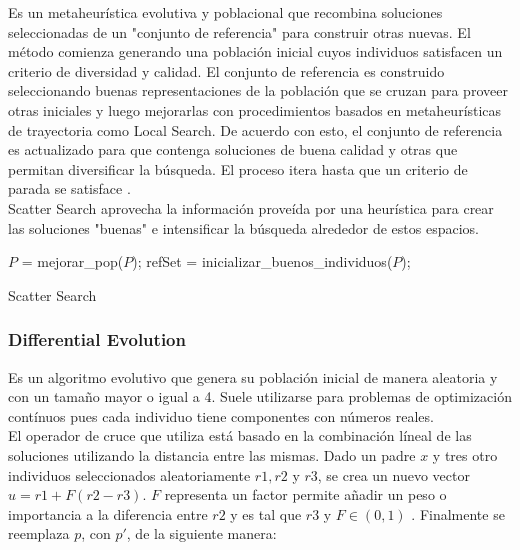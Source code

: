 \documentclass{ci5652}
\begin{document}
Es un metaheurística evolutiva y poblacional que recombina soluciones
seleccionadas de un "conjunto de referencia" para construir otras nuevas. El
método comienza generando una población inicial cuyos individuos satisfacen un
criterio de diversidad y calidad. El conjunto de referencia es construido
seleccionando buenas representaciones de la población que se cruzan para proveer
otras iniciales y luego mejorarlas con procedimientos basados en metaheurísticas
de trayectoria como Local Search. De acuerdo con esto, el conjunto de referencia
es actualizado para que contenga soluciones de buena calidad y otras que
permitan diversificar la búsqueda. El proceso itera hasta que un criterio de
parada se satisface \cite{Talbi_2009}.\\

Scatter Search aprovecha la información proveída por una heurística para crear
las soluciones "buenas" e intensificar la búsqueda alrededor de estos espacios.

\begin{algorithm}
 \DontPrintSemicolon
 \vspace*{0.1cm}
  $P$ = mejorar\_pop($P$);\;
  refSet = inicializar\_buenos\_individuos($P$);\;
 \vspace*{0.1cm}
 \caption{Scatter Search}
\end{algorithm}


\subsubsection{Differential Evolution}

Es un algoritmo evolutivo que genera su población inicial de manera aleatoria y
con un tamaño mayor o igual a 4. Suele utilizarse para problemas de optimización
contínuos pues cada individuo tiene componentes con números reales.\\

El operador de cruce que utiliza está basado en la combinación líneal de las
soluciones utilizando la distancia entre las mismas. Dado un padre $x$ y tres
otro individuos seleccionados aleatoriamente $r1, r2$ y $r3$, se crea un nuevo
vector $u = r1 + F(r2 - r3)$. $F$ representa un factor permite añadir un peso o
importancia a la diferencia entre $r2$ y es tal que $r3$ y $F \in (0, 1)$
\cite{Glover_2003}. Finalmente se reemplaza $p$, con $p'$, de la
siguiente manera:
\end{document}
